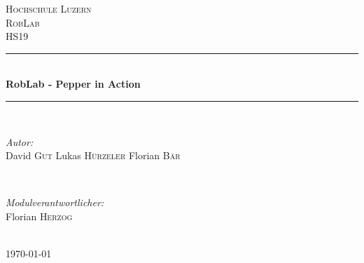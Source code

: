 \documentclass[11pt]{article}
\begin{document}
\begin{titlepage}

\newcommand{\HRule}{\rule{\linewidth}{0.5mm}} %

\center %

\textsc{\LARGE Hochschule Luzern}\\[1.5cm] %
\textsc{\Large RobLab}\\[0.5cm] %
\textsc{\large HS19}\\[0.5cm] %

\HRule \\[0.4cm] 
{ \huge \bfseries RobLab - Pepper in Action}\\[0.4cm] %
\HRule \\[1.5cm]

\begin{minipage}{0.4\textwidth}
\begin{flushleft} \large
\emph{Autor:}\\
David \textsc{Gut} %
Lukas \textsc{Hürzeler} %
Florian \textsc{Bär} %
\end{flushleft}
\end{minipage}
~
\begin{minipage}{0.4\textwidth}
\begin{flushright} \large
\emph{Modulverantwortlicher:} \\
Florian \textsc{Herzog} %
\end{flushright}
\end{minipage}\\[4cm]

{\large \today}\\[3cm] %

\vfill %

\end{titlepage}


\tableofcontents %

\newpage %
\end{document}
